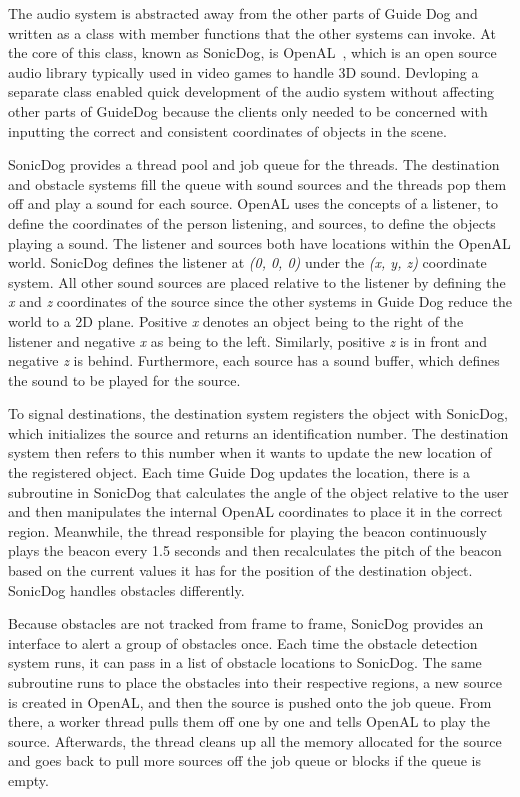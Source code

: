 The audio system is abstracted away from the other parts of Guide Dog and
written as a class with member functions that the other systems can invoke. At 
the core of this class, known as SonicDog, is OpenAL~\cite{openal-website}, which
is an open source audio library typically used in video games to handle 3D
sound. Devloping a separate class enabled quick development of the audio system 
without affecting other parts of GuideDog because the clients only needed to be
concerned with inputting the correct and consistent coordinates of objects in 
the scene.

SonicDog provides a thread pool and job queue for the threads. The destination 
and obstacle systems fill the queue with sound sources and the threads pop them 
off and play a sound for each source. OpenAL uses the concepts of a listener, to 
define the coordinates of the person listening, and sources, to define the 
objects playing a sound. The listener and sources both have locations within the 
OpenAL world. SonicDog defines the listener at \emph{(0, 0, 0)} under the 
\emph{(x, y, z)} coordinate system. All other sound sources are placed relative 
to the listener by defining the \emph{x} and \emph{z} coordinates of the source 
since the other systems in Guide Dog reduce the world to a 2D plane. Positive 
\emph{x} denotes an object being to the right of the listener and negative 
\emph{x} as being to the left. Similarly, positive \emph{z} is in front and 
negative \emph{z} is behind. Furthermore, each source has a sound buffer, which 
defines the sound to be played for the source.

To signal destinations, the destination system registers the object with
SonicDog, which initializes the source and returns an identification number. 
The destination system then refers to this number when it wants to update the
new location of the registered object. Each time Guide Dog updates the location,
there is a subroutine in SonicDog that calculates the angle of the object 
relative to the user and then manipulates the internal OpenAL coordinates to 
place it in the correct region. Meanwhile, the thread responsible for playing 
the beacon continuously plays the beacon every 1.5 seconds and then 
recalculates the pitch of the beacon based on the current values it has for the 
position of the destination object. SonicDog handles obstacles differently.

Because obstacles are not tracked from frame to frame, SonicDog provides an
interface to alert a group of obstacles once. Each time the obstacle detection
system runs, it can pass in a list of obstacle locations to SonicDog. The same
subroutine runs to place the obstacles into their respective regions, a new
source is created in OpenAL, and then the source is pushed onto the job queue.
From there, a worker thread pulls them off one by one and tells OpenAL to play
the source. Afterwards, the thread cleans up all the memory allocated for the
source and goes back to pull more sources off the job queue or blocks if the 
queue is empty.

